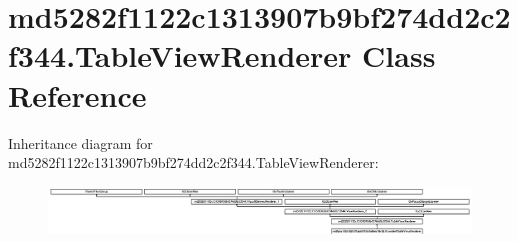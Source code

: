 \hypertarget{classmd5282f1122c1313907b9bf274dd2c2f344_1_1TableViewRenderer}{}\section{md5282f1122c1313907b9bf274dd2c2f344.\+Table\+View\+Renderer Class Reference}
\label{classmd5282f1122c1313907b9bf274dd2c2f344_1_1TableViewRenderer}
Inheritance diagram for md5282f1122c1313907b9bf274dd2c2f344.\+Table\+View\+Renderer\+:\begin{figure}[H]
\begin{center}
\leavevmode
\includegraphics[height=1.305361cm]{classmd5282f1122c1313907b9bf274dd2c2f344_1_1TableViewRenderer}
\end{center}
\end{figure}
